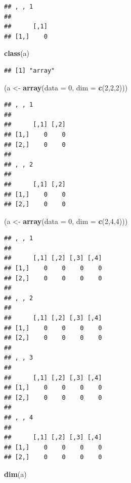 \documentclass[]{book}
\newenvironment{Shaded}{\begin{snugshade}}{\end{snugshade}}
\newcommand{\KeywordTok}[1]{\textcolor[rgb]{0.13,0.29,0.53}{\textbf{#1}}}
\newcommand{\DataTypeTok}[1]{\textcolor[rgb]{0.13,0.29,0.53}{#1}}
\newcommand{\DecValTok}[1]{\textcolor[rgb]{0.00,0.00,0.81}{#1}}
\newcommand{\StringTok}[1]{\textcolor[rgb]{0.31,0.60,0.02}{#1}}
\newcommand{\NormalTok}[1]{#1}
\begin{document}
\begin{verbatim}
## , , 1
## 
##      [,1]
## [1,]    0
\end{verbatim}

\begin{Shaded}
\begin{Highlighting}[]
\KeywordTok{class}\NormalTok{(a)}
\end{Highlighting}
\end{Shaded}

\begin{verbatim}
## [1] "array"
\end{verbatim}

\begin{Shaded}
\begin{Highlighting}[]
\NormalTok{(a <-}\StringTok{ }\KeywordTok{array}\NormalTok{(}\DataTypeTok{data =} \DecValTok{0}\NormalTok{, }\DataTypeTok{dim =} \KeywordTok{c}\NormalTok{(}\DecValTok{2}\NormalTok{,}\DecValTok{2}\NormalTok{,}\DecValTok{2}\NormalTok{)))}
\end{Highlighting}
\end{Shaded}

\begin{verbatim}
## , , 1
## 
##      [,1] [,2]
## [1,]    0    0
## [2,]    0    0
## 
## , , 2
## 
##      [,1] [,2]
## [1,]    0    0
## [2,]    0    0
\end{verbatim}

\begin{Shaded}
\begin{Highlighting}[]
\NormalTok{(a <-}\StringTok{ }\KeywordTok{array}\NormalTok{(}\DataTypeTok{data =} \DecValTok{0}\NormalTok{, }\DataTypeTok{dim =} \KeywordTok{c}\NormalTok{(}\DecValTok{2}\NormalTok{,}\DecValTok{4}\NormalTok{,}\DecValTok{4}\NormalTok{)))}
\end{Highlighting}
\end{Shaded}

\begin{verbatim}
## , , 1
## 
##      [,1] [,2] [,3] [,4]
## [1,]    0    0    0    0
## [2,]    0    0    0    0
## 
## , , 2
## 
##      [,1] [,2] [,3] [,4]
## [1,]    0    0    0    0
## [2,]    0    0    0    0
## 
## , , 3
## 
##      [,1] [,2] [,3] [,4]
## [1,]    0    0    0    0
## [2,]    0    0    0    0
## 
## , , 4
## 
##      [,1] [,2] [,3] [,4]
## [1,]    0    0    0    0
## [2,]    0    0    0    0
\end{verbatim}

\begin{Shaded}
\begin{Highlighting}[]
\KeywordTok{dim}\NormalTok{(a)}
\end{Highlighting}
\end{Shaded}
\end{document}
